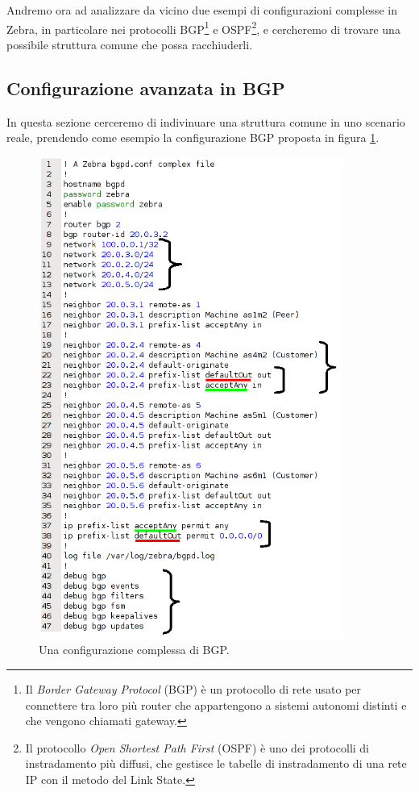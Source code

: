 Andremo ora ad analizzare da vicino due esempi di configurazioni complesse in Zebra, in particolare nei protocolli BGP\footnote{Il \emph{Border Gateway Protocol} (BGP) è un protocollo di rete usato per connettere tra loro più router che appartengono a sistemi autonomi distinti e che vengono chiamati gateway.} e OSPF\footnote{Il protocollo \emph{Open Shortest Path First} (OSPF) è uno dei protocolli di instradamento più diffusi, che gestisce le tabelle di instradamento di una rete IP con il metodo del Link State.}, e cercheremo di trovare una possibile struttura comune che possa racchiuderli.

\subsection{Configurazione avanzata in BGP}
In questa sezione cerceremo di indivinuare una struttura comune in uno scenario reale, prendendo come esempio la configurazione BGP proposta in figura \ref{figura:bgp_conf_schema}.

\begin{figure}[!htb]
	\centering
	\includegraphics[width=10cm]{images/bgp_conf_schema.png}
	\caption{Una configurazione complessa di BGP.}
	\label{figura:bgp_conf_schema}
\end{figure}

